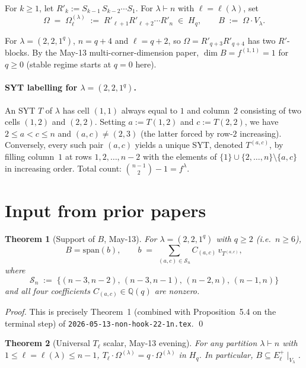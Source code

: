 \documentclass[11pt]{article}
\newtheorem{theorem}{Theorem}
\theoremstyle{definition}
\newcommand{\Hq}{H_q}
\newcommand{\Vlam}{V_\lambda}
\newcommand{\Om}{\Omega}
\begin{document}
For $k \ge 1$, let $R'_k := S_{k-1}\,S_{k-2}\cdots S_1$.  For
$\lambda \vdash n$ with $\ell = \ell(\lambda)$, set
\[
   \Om \;=\; \Om^{(\lambda)}_\ell \;:=\; R'_{\ell+1}R'_{\ell+2}\cdots R'_n
   \;\in\;\Hq,
   \qquad
   B \;:=\; \Om \cdot \Vlam.
\]

For $\lambda = (2,2,1^q)$, $n = q+4$ and $\ell = q+2$, so
$\Om = R'_{q+3}R'_{q+4}$ has two $R'$-blocks.  By the May-13
multi-corner-dimension paper, $\dim B = f^{(1,1)} = 1$ for $q \ge 0$
(stable regime starts at $q = 0$ here).

\paragraph{SYT labelling for $\lambda = (2,2,1^q)$.}  An SYT $T$ of
$\lambda$ has cell $(1,1)$ always equal to $1$ and column~$2$ consisting
of two cells $(1,2)$ and $(2,2)$.  Setting $a := T(1,2)$ and
$c := T(2,2)$, we have $2 \le a < c \le n$ and $(a,c) \ne (2,3)$
(the latter forced by row-$2$ increasing).  Conversely, every such
pair $(a,c)$ yields a unique SYT, denoted $T^{(a,c)}$, by filling
column~$1$ at rows $1, 2, \ldots, n-2$ with the elements of
$\{1\} \cup \{2,\ldots,n\}\setminus\{a,c\}$ in increasing order.
Total count: $\binom{n-1}{2} - 1 = f^\lambda$.

\section{Input from prior papers}\label{sec:input}

\begin{theorem}[Support of $B$, May-13]\label{thm:may13-support}
For $\lambda = (2,2,1^q)$ with $q \ge 2$ (i.e.\ $n \ge 6$),
\[
   B = \mathrm{span}(b), \qquad
   b \;=\; \sum_{(a,c) \in \mathcal{S}_n} C_{(a,c)}\,v_{T^{(a,c)}},
\]
where
\[
   \mathcal{S}_n \;:=\; \bigl\{(n-3,n-2),\,(n-3,n-1),\,(n-2,n),\,(n-1,n)\bigr\}
\]
and all four coefficients $C_{(a,c)} \in \mathbb{Q}(q)$ are nonzero.
\end{theorem}

\begin{proof}
This is precisely Theorem~1 (combined with Proposition~5.4 on the
terminal step) of \texttt{2026-05-13-non-hook-22-1n.tex}.
\qed
\end{proof}

\begin{theorem}[Universal $T_\ell$ scalar, May-13 evening]\label{thm:T-ell}
For any partition $\lambda \vdash n$ with $1 \le \ell = \ell(\lambda) \le n-1$,
$T_\ell \cdot \Om^{(\lambda)} = q \cdot \Om^{(\lambda)}$ in $\Hq$.  In
particular, $B \subseteq E_\ell^+\mid_{\Vlam}$.
\end{theorem}
\end{document}
